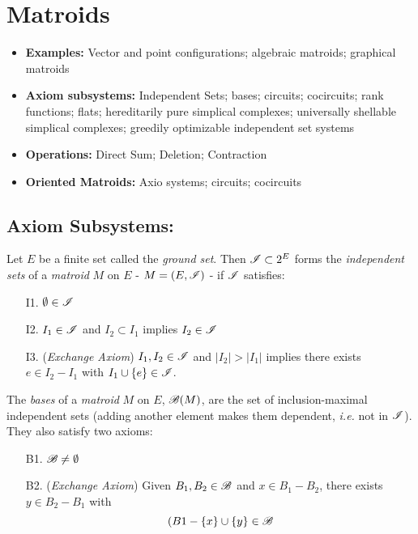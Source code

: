 \section{Matroids}

\begin{itemize}
    \item \textbf{Examples:} Vector and point configurations; algebraic matroids; graphical matroids
    \item \textbf{Axiom subsystems:} Independent Sets; bases; circuits; cocircuits; rank functions; flats; hereditarily pure simplical complexes; universally shellable simplical complexes; greedily optimizable independent set systems
    \item \textbf{Operations:} Direct Sum; Deletion; Contraction
    \item \textbf{Oriented Matroids:} Axio systems; circuits; cocircuits
\end{itemize}

\subsection{Axiom Subsystems:}

\begin{definition}
    Let $E$ be a finite set called the \textit{ground set}.
    Then $\mathscr{I} \subset 2^E$ forms the \textit{independent sets} of a \textit{matroid} $M$ on $E$ - $M = (E, \mathscr{I})$ - if $\mathscr{I}$ satisfies:
    \begin{enumerate}
        \item[I1.] $\emptyset \in \mathscr{I}$
        \item[I2.] $I_1 \in \mathscr{I}$ and $I_2 \subset I_1$ implies $I_2 \in \mathscr{I}$
        \item[I3.] (\textit{Exchange Axiom}) $I_1, I_2 \in \mathscr{I}$ and $|I_2| > |I_1|$ implies there exists $e \in I_2 - I_1$ with $I_1 \cup \lbrace e \rbrace \in \mathscr{I}$.
    \end{enumerate}
\end{definition}    

\begin{definition}[Bases]
    The \textit{bases} of a \textit{matroid} $M$ on $E$, $\mathscr{B}(M)$, are the set of inclusion-maximal independent sets (adding another element makes them dependent, \textit{i.e.} not in $\mathscr{I}$).
    They also satisfy two axioms:
    \begin{enumerate}
        \item[B1.] $\mathscr{B} \neq \emptyset$
        \item[B2.] (\textit{Exchange Axiom}) Given $B_1, B_2 \in \mathscr{B}$ and $x \in B_1 - B_2$, there exists $y \in B_2 - B_1$ with
            $$ (B1 - \{ x\} \cup \{ y\} \in \mathscr{B}$$
    \end{enumerate}
\end{definition}

